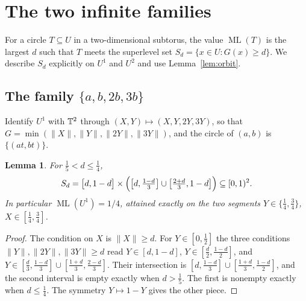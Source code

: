 \documentclass[12pt]{amsart}
\newtheorem{lemma}[theorem]{Lemma}
\theoremstyle{definition}\newtheorem{definition}[theorem]{Definition}
\theoremstyle{remark}\newtheorem{remark}[theorem]{Remark}
\newcommand{\norm}[1]{\lVert #1\rVert}
\newcommand{\ML}{\operatorname{ML}}
\newcommand{\Uone}{U^{1}}\newcommand{\Utwo}{U^{2}}
\begin{document}
\section{The two infinite families}\label{sec:families}
For a circle $T\subseteq U$ in a two-dimensional subtorus, the value $\ML(T)$ is the largest $d$ such that $T$ meets the superlevel set $S_d=\{x\in U:G(x)\ge d\}$. We describe $S_d$ explicitly on $\Uone$ and $\Utwo$ and use Lemma~\ref{lem:orbit}.

\subsection{The family $\{a,b,2b,3b\}$}
Identify $\Uone$ with $\mathbb T^2$ through $(X,Y)\mapsto(X,Y,2Y,3Y)$, so that $G=\min(\norm X,\norm Y,\norm{2Y},\norm{3Y})$, and the circle of $(a,b)$ is $\{(at,bt)\}$.

\begin{lemma}\label{lem:U1cells}
For $\frac15<d\le\frac14$,
\[
 S_d=\bigl[d,1-d\bigr]\times\Bigl(\bigl[d,\tfrac{1-d}{3}\bigr]\cup\bigl[\tfrac{2+d}{3},1-d\bigr]\Bigr)\subseteq[0,1)^2 .
\]
In particular $\ML(\Uone)=1/4$, attained exactly on the two segments $Y\in\{\frac14,\frac34\}$, $X\in[\frac14,\frac34]$.
\end{lemma}
\begin{proof}
The condition on $X$ is $\norm X\ge d$. For $Y\in[0,\frac12]$ the three conditions $\norm Y,\norm{2Y},\norm{3Y}\ge d$ read $Y\in[d,1-d]$, $Y\in[\frac d2,\frac{1-d}2]$, and $Y\in[\frac d3,\frac{1-d}3]\cup[\frac{1+d}3,\frac{2-d}3]$. Their intersection is $[d,\frac{1-d}3]\cup[\frac{1+d}3,\frac{1-d}2]$, and the second interval is empty exactly when $d>\frac15$. The first is nonempty exactly when $d\le\frac14$. The symmetry $Y\mapsto 1-Y$ gives the other piece.
\end{proof}
\end{document}

